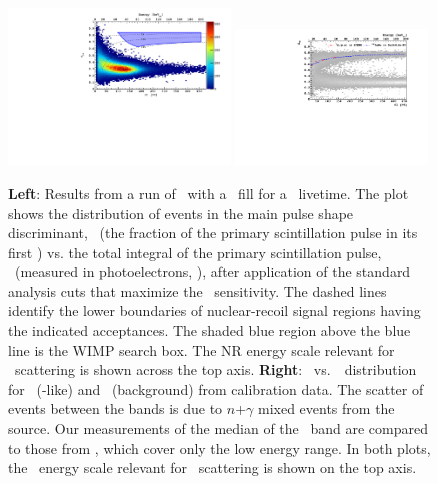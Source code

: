 \begin{figure}[!t]
\begin{center}
\includegraphics[width=0.525\textwidth]{./Figures/DSfHighMassSearch.pdf}
\includegraphics[width=0.455\textwidth]{./Figures/DSfUArAmBeDMSStCut.pdf}
\end{center}
\caption{{\bf Left}: Results from a run of \DSf\ with a \UAr\ fill for a \DSfDdLTPostQualCut\ livetime.  The plot shows the distribution of events in the main pulse shape discriminant, \FNine\ (the fraction of the primary scintillation pulse in its first \WindowFNine) vs. the total integral of the primary scintillation pulse, \SOne\ (measured in photoelectrons, \si{\pe}), after application of the standard analysis cuts that maximize the \DSfs\ sensitivity.  The dashed lines identify the lower boundaries of nuclear-recoil signal regions having the indicated acceptances.   The shaded blue region above the blue line is the WIMP search box.  The NR energy scale relevant for \WIMP\ scattering is shown across the top axis.  {\bf Right}: \FNine\ vs.~\SOne\ distribution for \NRs\ (\WIMP-like) and \ERs\ (background) from  calibration data.  The scatter of events between the bands is due to $n$+$\gamma$ mixed events from the source.  Our measurements of the median of the \NR\ band are compared to those from \SCENE, which cover only the low energy range. In both plots, the \NR\ energy scale relevant for \WIMP\ scattering is shown on the top axis.}
\label{fig:DSf-UArResults}	
\end{figure}

